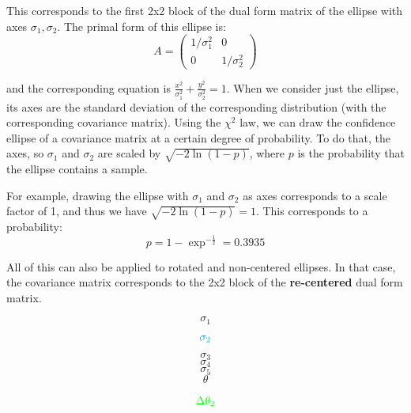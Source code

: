 This corresponds to the first 2x2 block of the dual form matrix of the ellipse with axes $\sigma_1, \sigma_2$.
The primal form of this ellipse is:
\begin{equation}
    A = \left(\begin{array}{cc}
        1/\sigma_1^2 & 0 \\
        0 & 1/\sigma_2^2
    \end{array}\right)
\end{equation}

and the corresponding equation is $\frac{x^2}{\sigma_1^2}+\frac{y^2}{\sigma_2^2} = 1$. When we consider just the ellipse, its axes are the standard deviation of the corresponding distribution (with the corresponding covariance matrix).
Using the $\chi^2$ law, we can draw the confidence ellipse of a covariance matrix at a certain degree of probability.
To do that, the axes, so $\sigma_1$ and $\sigma_2$ are scaled by $\sqrt{-2\ln{(1-p)}}$, where $p$ is the probability that the ellipse contains a sample.


For example, drawing the ellipse with $\sigma_1$ and $\sigma_2$ as axes corresponds to a scale factor of 1, and thus we have $\sqrt{-2\ln{(1-p)}} = 1$.
This corresponds to a probability:
\begin{equation}
    p = 1-\exp^{-\frac{1}{2}} = 0.3935
\end{equation}


All of this can also be applied to rotated and non-centered ellipses. In that case, the covariance matrix corresponds to the 2x2 block of the \textbf{re-centered} dual form matrix.


\newpage
\begin{equation}
    \sigma_1
\end{equation}
\begin{equation}
    \color{cyan}  \sigma_2
\end{equation}
\begin{equation}
    \sigma_3
\end{equation}
\begin{equation}
    \sigma_4
\end{equation}
\begin{equation}
    \sigma_5
\end{equation}
\begin{equation}
    \theta
\end{equation}

\begin{equation}
    \color{green}  \Delta \theta_2
\end{equation}


